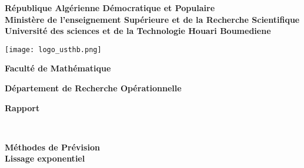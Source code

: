 \documentclass[a4paper,12pt]{report}
\begin{document}
\begin{center}
\textbf{République Algérienne Démocratique et Populaire \\
\setlength{\parskip}{2mm}
Ministère de l'enseignement Supérieure et de la Recherche Scientifique\\ }
\setlength{\parskip}{3mm}
\textbf{Université des sciences et de la Technologie Houari Boumediene \\
\setlength{\parskip}{3mm} }
\setlength{\parskip}{3mm}
\begin{Huge}
\setlength{\parskip}{4mm}
\begin{center}
\texttt{[image: logo\_usthb.png]}
\end{center}

\textbf{Faculté de Mathématique}
\end{Huge}
\end{center}

\begin{center}
\textbf{Département de Recherche Opérationnelle}
\end{center}
\vspace{1\baselineskip}

\begin{center}
\begin{Huge}
\textbf{Rapport}

\end{Huge}\\
\end{center}

\bigskip
\begin{center}
\begin{Large}
\textbf{Méthodes de Prévision \\
\setlength{\parskip}{3mm}
Lissage exponentiel }
\end{Large}
\end{center}
\vspace{5\baselineskip}
\end{document}
